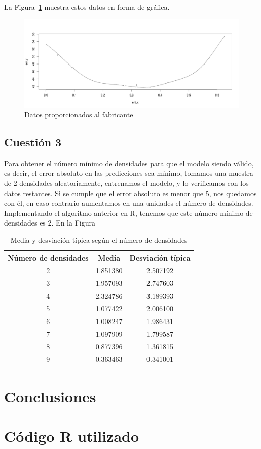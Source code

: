 \documentclass[12pt,a4paper,twoside,openright,titlepage,final]{article}
\begin{document}
La Figura~\ref{fig:plot_fabricante} muestra estos datos en forma de gráfica.\\

\begin{figure}
\centering
\includegraphics[width=0.8\linewidth]{imagenes/plot_fabricante}
\caption{Datos proporcionados al fabricante}
\label{fig:plot_fabricante}
\end{figure}

\subsection{Cuestión 3}

Para obtener el número mínimo de densidades para que el modelo siendo válido, es decir, el error absoluto en las predicciones sea mínimo, tomamos una muestra de 2 densidades aleatoriamente, entrenamos el modelo, y lo verificamos con los datos restantes. Si se cumple que el error absoluto es menor que 5, nos quedamos con él, en caso contrario aumentamos en una unidades el número de densidades.\\

Implementando el algoritmo anterior en R, tenemos que este número mínimo de densidades es 2. En la Figura

\begin{table}[htbp!]
\centering
\caption{Media y desviación típica según el número de densidades}
\label{tbl:medias}
\begin{tabular}{@{}ccc@{}}
\toprule
Número de densidades & Media     & Desviación típica \\ \midrule
2                    & 1.851380  & 2.507192          \\
3                    & 1.957093  & 2.747603          \\
4                    & 2.324786  & 3.189393          \\
5                    & 1.077422  & 2.006100          \\
6                    & 1.008247  & 1.986431          \\
7                    & 1.097909  & 1.799587          \\
8                    & 0.877396  & 1.361815          \\
9                    & 0.363463  & 0.341001         \\ \bottomrule
\end{tabular}
\end{table}

\section{Conclusiones}

\section{Código R utilizado}
\end{document}

